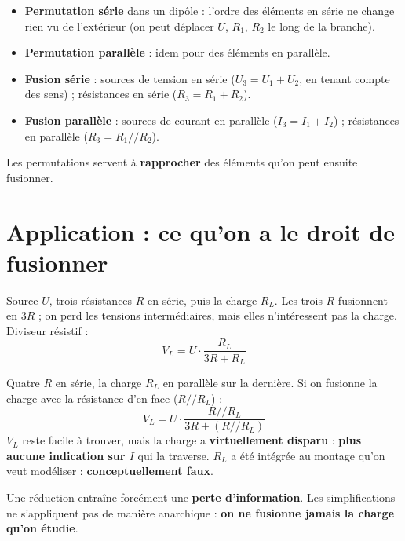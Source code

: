 \begin{propbox}[title=Ce qu'on sait faire localement]
\begin{itemize}
  \item \textbf{Permutation série} dans un dipôle : l'ordre des éléments en série ne change
        rien vu de l'extérieur (on peut déplacer $U$, $R_1$, $R_2$ le long de la branche).
  \item \textbf{Permutation parallèle} : idem pour des éléments en parallèle.
  \item \textbf{Fusion série} : sources de tension en série ($U_3 = U_1 + U_2$, en tenant
        compte des sens) ; résistances en série ($R_3 = R_1 + R_2$).
  \item \textbf{Fusion parallèle} : sources de courant en parallèle ($I_3 = I_1 + I_2$) ;
        résistances en parallèle ($R_3 = R_1/\!/R_2$).
\end{itemize}
Les permutations servent à \textbf{rapprocher} des éléments qu'on peut ensuite fusionner.
\end{propbox}

\section{Application : ce qu'on a le droit de fusionner}


\begin{exbox}[title={Expérience 1 : réduction correcte}]
Source $U$, trois résistances $R$ en série, puis la charge $R_L$. Les trois $R$ fusionnent en
$3R$ ; on perd les tensions intermédiaires, mais elles n'intéressent pas la charge. Diviseur
résistif :
\[ V_L = U\cdot\frac{R_L}{3R + R_L} \]
\end{exbox}

\begin{exbox}[title={Expérience 2 : \og pas la bonne méthode\fg{}}]
Quatre $R$ en série, la charge $R_L$ en parallèle sur la dernière. Si on fusionne la charge
avec la résistance d'en face ($R/\!/R_L$) :
\[ V_L = U\cdot\frac{R/\!/R_L}{3R + (R/\!/R_L)} \]
$V_L$ reste facile à trouver, mais la charge a \textbf{virtuellement disparu} : \textbf{plus
aucune indication sur $I$} qui la traverse. $R_L$ a été intégrée au montage qu'on veut
modéliser : \textbf{conceptuellement faux}.
\end{exbox}

\begin{warnbox}[title=Morale]
Une réduction entraîne forcément une \textbf{perte d'information}. Les simplifications ne
s'appliquent pas de manière \og anarchique\fg{} : \textbf{on ne fusionne jamais la charge
qu'on étudie}.
\end{warnbox}

